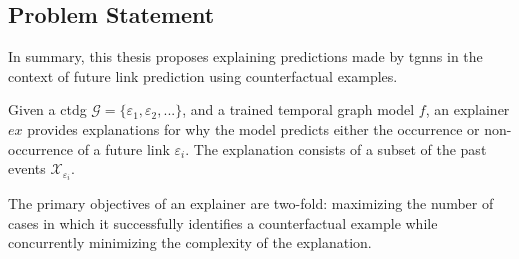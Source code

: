 

\subsection{Problem Statement}
\label{s_ProblemFormulation_ProblemStatement}

In summary, this thesis proposes explaining predictions made by \glspl{tgnn} in the context of future link prediction using counterfactual examples.

Given a \gls{ctdg} $\mathcal{G} = \{\varepsilon_{1}, \varepsilon_{2}, ...\}$, and a trained temporal graph model $f$, an explainer $ex$ provides explanations for why the model predicts either the occurrence or non-occurrence of a future link $\varepsilon_{i}$. The explanation consists of a subset of the past events $\mathcal{X}_{\varepsilon_{i}}$.

The primary objectives of an explainer are two-fold: maximizing the number of cases in which it successfully identifies a counterfactual example while concurrently minimizing the complexity of the explanation.
